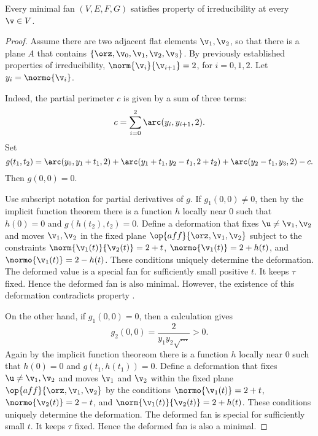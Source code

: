 \begin{lemma} 
Every minimal fan $(V,E,F,G)$ satisfies property  of irreducibility at every $\v\in V$.
\end{lemma}

\begin{proof}
Assume there are two adjacent flat elements $\v_1,\v_2$, so that
there is a plane $A$ that contains $\{\orz,\v_0,\v_1,\v_2,\v_3\}$.
By previously established properties of irreducibility,
%
$\norm{\v_i}{\v_{i+1}}=2$, for $i=0,1,2$.  Let $y_i = \normo{\v_i}$.
%

  Indeed, the partial
perimeter $c$ is given by a sum of three terms:
\begin{displaymath}
c=\sum_{i=0}^2\arc(y_i,y_{i+1},2).
\end{displaymath}
Set
\begin{displaymath}
  g(t_1,t_2) = \arc(y_0,y_1+t_1,2) 
+ \arc(y_1+t_1,y_2-t_1,2+t_2) + \arc(y_2-t_1,y_3,2) - c.
\end{displaymath}
Then $g(0,0)=0$.  

Use subscript notation for partial derivatives of $g$.  If $g_1(0,0)
\ne 0$, then by the implicit function theorem there is a function $h$
locally near $0$ such that $h(0)=0$ and $g(h(t_2),t_2)=0$.  Define a
deformation that fixes $\u\ne\v_1,\v_2$ and moves $\v_1,\v_2$ in the
fixed plane $\op{aff}\{\orz,\v_1,\v_2\}$ subject to the constraints
$\norm{\v_1(t)}{\v_2(t)}=2+t$, $\normo{\v_1(t)} = 2+h(t)$, and
$\normo{\v_1(t)} = 2-h(t)$.  These conditions uniquely determine the
deformation.  The deformed value is a special fan for sufficiently
small positive $t$.  It keeps $\tau$ fixed.  Hence the deformed fan is
also minimal.  However, the existence of this deformation contradicts
property .

On the other hand, if $ g_1(0,0) =0$, then a calculation gives
\begin{displaymath}g_2(0,0) = \dfrac{2}{y_1y_2\sqrt{\ldots}} >
0.\end{displaymath} Again by the implicit function theoreom there is
a function $h$ locally near $0$ such that $h(0)=0$ and
$g(t_1,h(t_1))=0$.  Define a deformation that fixes $\u\ne \v_1,\v_2$
and moves $\v_1$ and $\v_2$ within the fixed plane
$\op{aff}\{\orz,\v_1,\v_2\}$ by the conditions $\normo{\v_1(t)} = 2 +
t$, $\normo{\v_2(t)} = 2 - t$, and $\norm{\v_1(t)}{\v_2(t)}=2+h(t)$.
These conditions uniquely determine the deformation.  The deformed fan
is special for sufficiently small $t$.  It keeps $\tau$ fixed.  Hence
the deformed fan is also a minimal.


\end{proof}
